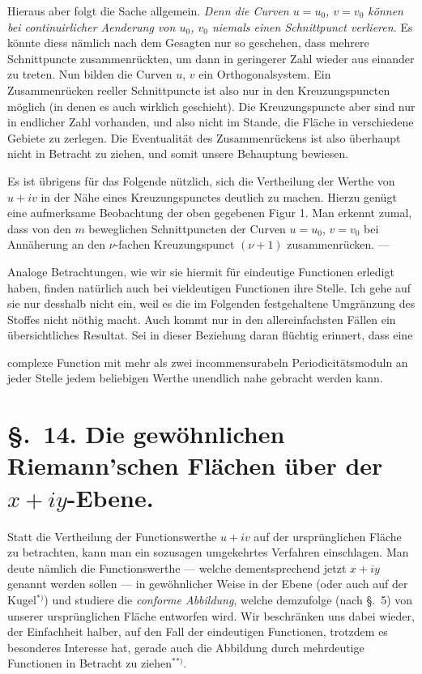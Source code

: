 \documentclass{article}
\begin{document}
Hieraus aber folgt die Sache allgemein. \emph{Denn die Curven $u = u_{0}$, $v = v_{0}$ können bei continuirlicher Aenderung von $u_{0}$, $v_{0}$ niemals einen Schnittpunct verlieren.} Es könnte diess nämlich nach dem Gesagten nur so geschehen, dass mehrere Schnittpuncte zusammenrückten, um dann in geringerer Zahl wieder aus einander zu treten. Nun bilden die Curven $u$, $v$ ein Orthogonalsystem. Ein Zusammenrücken reeller Schnittpuncte ist also nur in den Kreuzungspuncten möglich (in denen es auch wirklich geschieht). Die Kreuzungspuncte aber sind nur in endlicher Zahl vorhanden, und also nicht im Stande, die Fläche in verschiedene Gebiete zu zerlegen. Die Eventualität des Zusammenrückens ist also überhaupt nicht in Betracht zu ziehen, und somit unsere Behauptung bewiesen.

Es ist übrigens für das Folgende nützlich, sich die Vertheilung der Werthe von $u + iv$ in der Nähe eines Kreuzungspunctes deutlich zu machen. Hierzu genügt eine aufmerksame Beobachtung der oben gegebenen Figur 1. Man erkennt zumal, dass von den $m$ beweglichen Schnittpuncten der Curven $u = u_{0}$, $v = v_{0}$ bei Annäherung an den $\nu$-fachen Kreuzungspunct $(\nu + 1)$ zusammenrücken. ---

Analoge Betrachtungen, wie wir sie hiermit für eindeutige Functionen erledigt haben, finden natürlich auch bei vieldeutigen Functionen ihre Stelle. Ich gehe auf sie nur desshalb nicht ein, weil es die im Folgenden festgehaltene Umgränzung des Stoffes nicht nöthig macht. Auch kommt nur in den allereinfachsten Fällen ein übersichtliches Resultat. Sei in dieser Beziehung daran flüchtig erinnert, dass eine

complexe Function mit mehr als zwei incommensurabeln Periodicitätsmoduln an jeder Stelle jedem beliebigen Werthe unendlich nahe gebracht werden kann.

\section*{§.~14. Die gewöhnlichen Riemann'schen Flächen über der $x + iy$-Ebene.}

Statt die Vertheilung der Functionswerthe $u + iv$ auf der ursprünglichen Fläche zu betrachten, kann man ein sozusagen umgekehrtes Verfahren einschlagen. Man deute nämlich die Functionswerthe --- welche dementsprechend jetzt $x + iy$ genannt werden sollen --- in gewöhnlicher Weise in der Ebene (oder auch auf der Kugel${}^{*)}$) und studiere die \emph{conforme Abbildung}, welche demzufolge (nach §.~5) von unserer ursprünglichen Fläche entworfen wird. Wir beschränken uns dabei wieder, der Einfachheit halber, auf den Fall der eindeutigen Functionen, trotzdem es besonderes Interesse hat, gerade auch die Abbildung durch mehrdeutige Functionen in Betracht zu ziehen${}^{**)}$.
\end{document}
